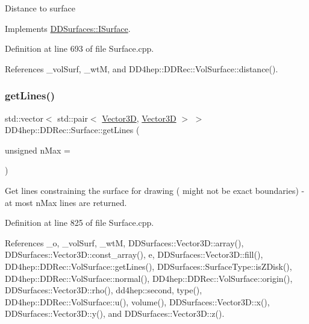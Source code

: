 Distance to surface 

Implements \hyperlink{class_d_d_surfaces_1_1_i_surface_a430ebd157354388b50218dfb356a9ca1}{D\+D\+Surfaces\+::\+I\+Surface}.



Definition at line 693 of file Surface.\+cpp.



References \+\_\+vol\+Surf, \+\_\+wtM, and D\+D4hep\+::\+D\+D\+Rec\+::\+Vol\+Surface\+::distance().

\hypertarget{class_d_d4hep_1_1_d_d_rec_1_1_surface_a54c81a4857e760fd9abb6773a9c19301}{}\label{class_d_d4hep_1_1_d_d_rec_1_1_surface_a54c81a4857e760fd9abb6773a9c19301} 
\subsubsection{\texorpdfstring{get\+Lines()}{getLines()}}
{\footnotesize\ttfamily std\+::vector$<$ std\+::pair$<$ \hyperlink{class_d_d_surfaces_1_1_vector3_d}{Vector3D}, \hyperlink{class_d_d_surfaces_1_1_vector3_d}{Vector3D} $>$ $>$ D\+D4hep\+::\+D\+D\+Rec\+::\+Surface\+::get\+Lines (\begin{DoxyParamCaption}\item[{unsigned}]{n\+Max = {} }\end{DoxyParamCaption})\hspace{0.3cm}{\ttfamily [virtual]}}

Get lines constraining the surface for drawing ( might not be exact boundaries) -\/ at most n\+Max lines are returned. 

Definition at line 825 of file Surface.\+cpp.



References \+\_\+o, \+\_\+vol\+Surf, \+\_\+wtM, D\+D\+Surfaces\+::\+Vector3\+D\+::array(), D\+D\+Surfaces\+::\+Vector3\+D\+::const\+\_\+array(), e, D\+D\+Surfaces\+::\+Vector3\+D\+::fill(), D\+D4hep\+::\+D\+D\+Rec\+::\+Vol\+Surface\+::get\+Lines(), D\+D\+Surfaces\+::\+Surface\+Type\+::is\+Z\+Disk(), D\+D4hep\+::\+D\+D\+Rec\+::\+Vol\+Surface\+::normal(), D\+D4hep\+::\+D\+D\+Rec\+::\+Vol\+Surface\+::origin(), D\+D\+Surfaces\+::\+Vector3\+D\+::rho(), dd4hep\+::second, type(), D\+D4hep\+::\+D\+D\+Rec\+::\+Vol\+Surface\+::u(), volume(), D\+D\+Surfaces\+::\+Vector3\+D\+::x(), D\+D\+Surfaces\+::\+Vector3\+D\+::y(), and D\+D\+Surfaces\+::\+Vector3\+D\+::z().

